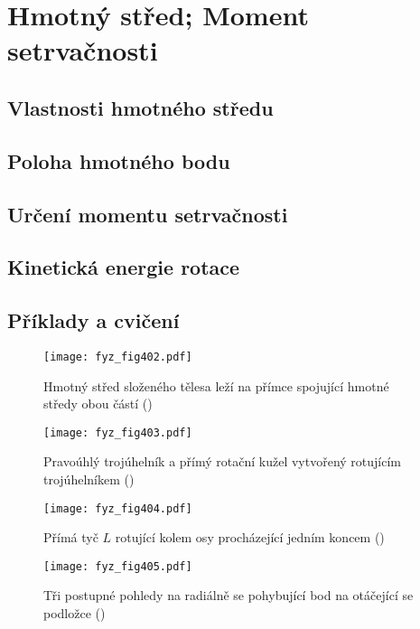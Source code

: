 {
\chapter{Hmotný střed; Moment setrvačnosti}\label{fyz:IchapXIX}
\minitoc
  \section{Vlastnosti hmotného středu}\label{fyz:IchapXIXsecI}
  \section{Poloha hmotného bodu}\label{fyz:IchapXIXsecII}
  \section{Určení momentu setrvačnosti}\label{fyz:IchapXIXsecIII}
  \section{Kinetická energie rotace}\label{fyz:IchapXIXsecIV}
  \section{Příklady a cvičení}\label{fyz:IchapXIXsecV}

  \begin{figure}[ht!] %
    \centering
    \texttt{[image: fyz\_fig402.pdf]}
    \caption{Hmotný střed složeného tělesa leží na přímce spojující hmotné středy obou částí
             (\cite[s.~260]{Feynman01})}
    \label{fyz_fig402}
  \end{figure}

  \begin{figure}[ht!] %
    \centering
    \texttt{[image: fyz\_fig403.pdf]}
    \caption{Pravoúhlý trojúhelník a přímý rotační kužel vytvořený rotujícím trojúhelníkem 
             (\cite[s.~263]{Feynman01})}
    \label{fyz_fig403}
  \end{figure}
  \begin{figure}[ht!] %
    \centering
    \texttt{[image: fyz\_fig404.pdf]}
    \caption{Přímá tyč \(L\) rotující kolem osy procházející jedním koncem
             (\cite[s.~264]{Feynman01})}
    \label{fyz_fig404}
  \end{figure}

  \begin{figure}[ht!] %
    \centering
    \texttt{[image: fyz\_fig405.pdf]}
    \caption{Tři postupné pohledy na radiálně se pohybující bod na otáčející se podložce
             (\cite[s.~269]{Feynman01})}
    \label{fyz_fig405}
  \end{figure}
} %
\printbibliography[title={Seznam literatury}, heading=subbibliography]
